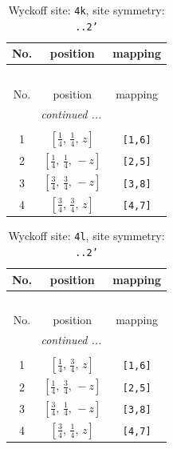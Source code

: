 \documentclass[fleqn,8pt]{jsarticle}
\begin{document}
\renewcommand{\arraystretch}{1.2}
\begin{longtable}{ccc}
\caption{Wyckoff site: {\tt 4k}, site symmetry: {\tt ..2'}}
 \\
 \hline \hline
No. & position & mapping \\ \hline \endfirsthead

\multicolumn{2}{l}{\tablename\ \thetable{}} \\
 \hline \hline
No. & position & mapping \\ \hline \endhead

 \hline \hline
\multicolumn{2}{r}{\footnotesize\it continued ...} \\ \endfoot

 \hline \hline
\multicolumn{2}{r}{} \\ \endlastfoot

1 & $\left[ \frac{1}{4},\, \frac{1}{4},\, z \right]$ & {\tt [1,6]} \\ \hline
2 & $\left[ \frac{1}{4},\, \frac{1}{4},\, - z \right]$ & {\tt [2,5]} \\ \hline
3 & $\left[ \frac{3}{4},\, \frac{3}{4},\, - z \right]$ & {\tt [3,8]} \\ \hline
4 & $\left[ \frac{3}{4},\, \frac{3}{4},\, z \right]$ & {\tt [4,7]} \\
\end{longtable}
\renewcommand{\arraystretch}{1.2}
\begin{longtable}{ccc}
\caption{Wyckoff site: {\tt 4l}, site symmetry: {\tt ..2'}}
 \\
 \hline \hline
No. & position & mapping \\ \hline \endfirsthead

\multicolumn{2}{l}{\tablename\ \thetable{}} \\
 \hline \hline
No. & position & mapping \\ \hline \endhead

 \hline \hline
\multicolumn{2}{r}{\footnotesize\it continued ...} \\ \endfoot

 \hline \hline
\multicolumn{2}{r}{} \\ \endlastfoot

1 & $\left[ \frac{1}{4},\, \frac{3}{4},\, z \right]$ & {\tt [1,6]} \\ \hline
2 & $\left[ \frac{1}{4},\, \frac{3}{4},\, - z \right]$ & {\tt [2,5]} \\ \hline
3 & $\left[ \frac{3}{4},\, \frac{1}{4},\, - z \right]$ & {\tt [3,8]} \\ \hline
4 & $\left[ \frac{3}{4},\, \frac{1}{4},\, z \right]$ & {\tt [4,7]} \\
\end{longtable}
\end{document}
